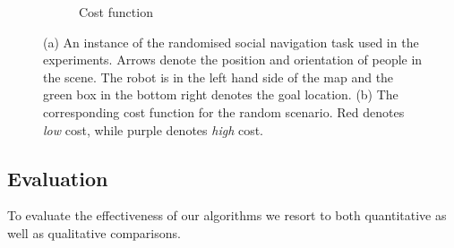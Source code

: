\documentclass{article}  %
\begin{document}
\begin{figure}[tbh]
\begin{subfigure}[b]{0.435\columnwidth}
    \caption{Cost function}
    \label{fig:cost_f}
  \end{subfigure} 

  \caption{(a) An instance of the randomised social navigation task used in the experiments. Arrows denote the position and orientation of people in the scene. The robot is in the left hand side of the map and the green box in the bottom right denotes the goal location. (b) The corresponding cost function for the random scenario. Red denotes \emph{low} cost, while purple denotes \emph{high} cost.}
  \label{fig:setting}
  \end{figure}


	\subsection{Evaluation}

	To evaluate the effectiveness of our algorithms we resort to both quantitative as well as qualitative comparisons.
\end{document}

